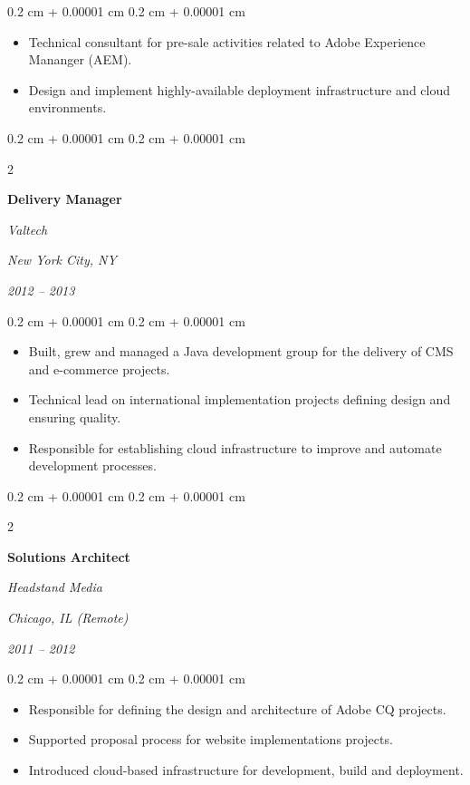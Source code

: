 \documentclass[10pt, a4paper]{article}
\newenvironment{highlights}{
    \begin{itemize}[
        topsep=0.10 cm,
        parsep=0.10 cm,
        partopsep=0pt,
        itemsep=0pt,
        leftmargin=0.4 cm + 10pt
    ]
}{
    \end{itemize}
} %
\newenvironment{onecolentry}{
    \begin{adjustwidth}{
        0.2 cm + 0.00001 cm
    }{
        0.2 cm + 0.00001 cm
    }
}{
    \end{adjustwidth}
} %
\newenvironment{twocolentry}[2][]{
    \onecolentry
    \def\secondColumn{#2}
    \setcolumnwidth{\fill, 8 cm}
    \begin{paracol}{2}
}{
    \switchcolumn \raggedleft \secondColumn
    \end{paracol}
    \endonecolentry
} %
\begin{document}
\vspace{0.10 cm}
\begin{onecolentry}
    \begin{highlights}
        \item Technical consultant for pre-sale activities related to Adobe Experience Mananger (AEM).
        \item Design and implement highly-available deployment infrastructure and cloud environments.
    \end{highlights}
\end{onecolentry}

\vspace{0.20 cm}



%
%
\begin{twocolentry}{
        \textit{New York City, NY}

        \textit{2012 – 2013}}
    \textbf{Delivery Manager}

    \textit{Valtech}
\end{twocolentry}

\vspace{0.10 cm}
\begin{onecolentry}
    \begin{highlights}
        \item Built, grew and managed a Java development group for the delivery of CMS and e-commerce projects.
        \item Technical lead on international implementation projects defining design and ensuring quality.
        \item Responsible for establishing cloud infrastructure to improve and automate development processes.
    \end{highlights}
\end{onecolentry}

\vspace{0.20 cm}



%
%
\begin{twocolentry}{
        \textit{Chicago, IL (Remote)}

        \textit{2011 – 2012}}
    \textbf{Solutions Architect}

    \textit{Headstand Media}
\end{twocolentry}

\vspace{0.10 cm}
\begin{onecolentry}
    \begin{highlights}
        \item Responsible for defining the design and architecture of Adobe CQ projects.
        \item Supported proposal process for website implementations projects.
        \item Introduced cloud-based infrastructure for development, build and deployment.
    \end{highlights}
\end{onecolentry}
\end{document}
